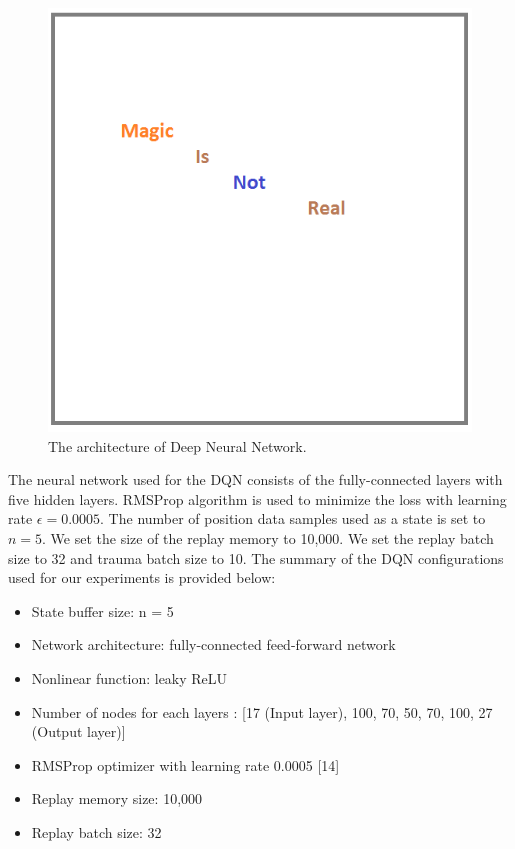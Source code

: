 \begin{figure}[h]
\centering
\includegraphics[width=1.0\textwidth]{figs/magic}
\caption{The architecture of Deep Neural Network.}
\label{fig:dnn}
\end{figure}

The neural network used for the DQN consists of the fully-connected layers with five hidden layers. RMSProp algorithm is used to minimize the loss with learning rate $\epsilon = 0.0005$. The number of position data samples used as a state is set to $n = 5$. We set the size of the replay memory to 10,000. We set the replay batch size to 32 and trauma batch size to 10. The summary of the DQN configurations used for our experiments is provided below:

\begin{itemize}
\item State buffer size: n = 5
\item Network architecture: fully-connected feed-forward network
\item Nonlinear function: leaky ReLU
\item Number of nodes for each layers : [17 (Input layer), 100, 70, 50, 70, 100, 27 (Output layer)]
\item RMSProp optimizer with learning rate 0.0005 [14]
\item Replay memory size: 10,000
\item Replay batch size: 32
\end{itemize}


